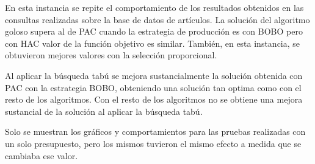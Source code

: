 En esta instancia se repite el comportamiento de los resultados obtenidos en las consultas realizadas sobre la base de datos de artículos. La solución del algoritmo goloso supera al de PAC cuando la estrategia de producción es con BOBO pero con HAC valor de la función objetivo es similar. También, en esta instancia, se obtuvieron mejores valores con la selección proporcional.

Al aplicar la búsqueda tabú se mejora sustancialmente la solución obtenida con PAC con la estrategia BOBO, obteniendo una solución tan optima como con el resto de los algoritmos. Con el resto de los algoritmos no se obtiene una mejora sustancial de la solución al aplicar la búsqueda tabú.

Solo se muestran los gráficos y comportamientos para las pruebas realizadas con un solo presupuesto, pero los mismos tuvieron el mismo efecto a medida que se cambiaba ese valor.

